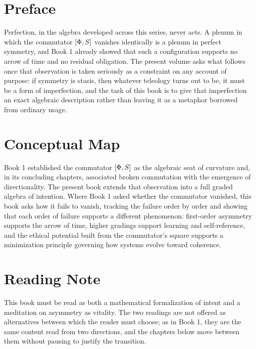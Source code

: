 \chapter*{Preface}

Perfection, in the algebra developed across this series, never acts. A plenum in which the commutator $[\Phi, S]$ vanishes identically is a plenum in perfect symmetry, and Book 1 already showed that such a configuration supports no arrow of time and no residual obligation. The present volume asks what follows once that observation is taken seriously as a constraint on any account of purpose: if symmetry is stasis, then whatever teleology turns out to be, it must be a form of imperfection, and the task of this book is to give that imperfection an exact algebraic description rather than leaving it as a metaphor borrowed from ordinary usage.

\chapter*{Conceptual Map}

Book 1 established the commutator $[\Phi, S]$ as the algebraic seat of curvature and, in its concluding chapters, associated broken commutation with the emergence of directionality. The present book extends that observation into a full graded algebra of intention. Where Book 1 asked whether the commutator vanished, this book asks how it fails to vanish, tracking the failure order by order and showing that each order of failure supports a different phenomenon: first-order asymmetry supports the arrow of time, higher gradings support learning and self-reference, and the ethical potential built from the commutator's square supports a minimization principle governing how systems evolve toward coherence.

\chapter*{Reading Note}

This book must be read as both a mathematical formalization of intent and a meditation on asymmetry as vitality. The two readings are not offered as alternatives between which the reader must choose; as in Book 1, they are the same content read from two directions, and the chapters below move between them without pausing to justify the transition.

